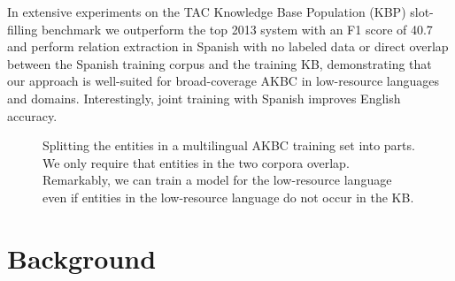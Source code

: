 In extensive experiments on the TAC Knowledge Base Population (KBP) slot-filling benchmark we outperform the top 2013 system with an F1 score of 40.7 and perform relation extraction in Spanish with no labeled data or direct overlap between the Spanish training corpus and the training KB, demonstrating that our approach is well-suited for broad-coverage AKBC in low-resource languages and domains. Interestingly, joint training with Spanish improves English accuracy.


\begin{figure}[h!]
\begin{center}
\vspace{-1.9069cm}

\def\firstcircle{(0,0) circle (1.5cm)}
\def\secondcircle{(0:2cm) circle (1.5cm)}
\def\midline{[line width=1pt, dashed] node[label={[label distance=-3cm]-15:in KB}] {} node[label={[label distance=-3.5cm]15:not in KB}] {} (-3,0) -- (5,0)}
\caption{Splitting the entities in a multilingual AKBC training set into parts. We only require that entities in the two corpora overlap. Remarkably, we can train a model for the low-resource language even if entities in the low-resource language do not occur in the KB. \label{tab:multilingual-corpora}}
\end{center}
\vspace{-.4cm}
\end{figure}

\section{Background \label{sec:background}}

